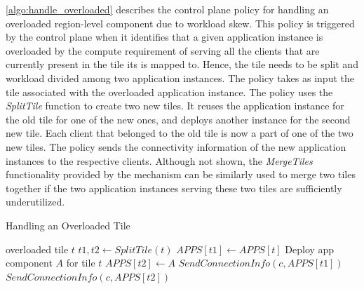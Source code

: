 \cref{algo:handle_overloaded} describes the control plane policy for handling an overloaded region-level component due to workload skew. This policy is triggered by the control plane when it identifies that a given application instance is overloaded by the compute requirement of serving all the clients that are currently present in the tile its is mapped to. Hence, the tile needs to be split and workload divided among two application instances. The policy takes as input the tile associated with the overloaded application instance. The policy uses the \textit{SplitTile} function to create two new tiles. It reuses the application instance for the old tile for one of the new ones, and deploys another instance for the second new tile. Each client that belonged to the old tile is now a part of one of the two new tiles. The policy sends the connectivity information of the new application instances to the respective clients. Although not shown, the \textit{MergeTiles} functionality provided by the mechanism can be similarly used to merge two tiles together if the two application instances serving these two tiles are sufficiently underutilized.
\begin{algorithm}
\caption{Handling an Overloaded Tile}
\begin{algorithmic}
\Require overloaded tile $t$
\State $t1, t2 \gets SplitTile \left( t \right)$
\State $APPS \left[ t1 \right] \gets APPS \left[ t \right]$
\State Deploy app component $A$ for tile $t$
\State $APPS  \left[ t2 \right] \gets A$
    \State $SendConnectionInfo \left(c, APPS \left[ t1 \right] \right)$
\EndFor
{}
    \State $SendConnectionInfo \left(c, APPS \left[ t2 \right] \right)$
\EndFor
\end{algorithmic}
\label{algo:handle_overloaded}
\end{algorithm}

